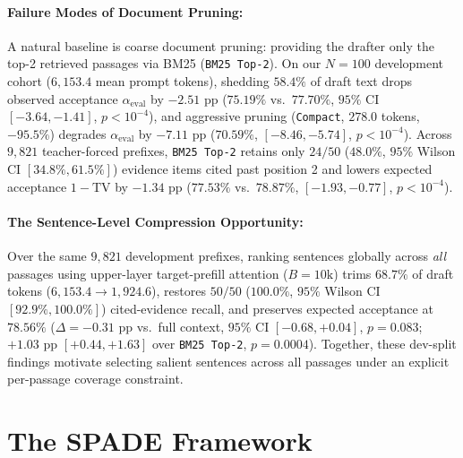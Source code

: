 \documentclass[11pt]{article}
\begin{document}
\paragraph{Failure Modes of Document Pruning:}
A natural baseline is coarse document pruning: providing the drafter only the top-2 retrieved passages via BM25 (\texttt{BM25 Top-2}). On our $N=100$ development cohort ($6,153.4$ mean prompt tokens), shedding $58.4\%$ of draft text drops observed acceptance $\alpha_{\text{eval}}$ by $-2.51\text{ pp}$ ($75.19\%$ vs.\ $77.70\%$, $95\%$ CI $[-3.64, -1.41]$, $p<10^{-4}$), and aggressive pruning (\texttt{Compact}, $278.0$ tokens, $-95.5\%$) degrades $\alpha_{\text{eval}}$ by $-7.11\text{ pp}$ ($70.59\%$, $[-8.46, -5.74]$, $p<10^{-4}$). Across $9,821$ teacher-forced prefixes, \texttt{BM25 Top-2} retains only $24/50$ ($48.0\%$, $95\%$ Wilson CI $[34.8\%, 61.5\%]$) evidence items cited past position 2 and lowers expected acceptance $1-\text{TV}$ by $-1.34\text{ pp}$ ($77.53\%$ vs.\ $78.87\%$, $[-1.93, -0.77]$, $p<10^{-4}$).

\paragraph{The Sentence-Level Compression Opportunity:}
Over the same $9,821$ development prefixes, ranking sentences globally across \textit{all} passages using upper-layer target-prefill attention ($B=10\text{k}$) trims $68.7\%$ of draft tokens ($6,153.4 \to 1,924.6$), restores $50/50$ ($100.0\%$, $95\%$ Wilson CI $[92.9\%, 100.0\%]$) cited-evidence recall, and preserves expected acceptance at $78.56\%$ ($\Delta = -0.31\text{ pp}$ vs.\ full context, $95\%$ CI $[-0.68, +0.04]$, $p=0.083$; $+1.03\text{ pp}$ $[+0.44, +1.63]$ over \texttt{BM25 Top-2}, $p=0.0004$). Together, these dev-split findings motivate selecting salient sentences across all passages under an explicit per-passage coverage constraint.

\section{The SPADE Framework}
\label{sec:method}
\end{document}
